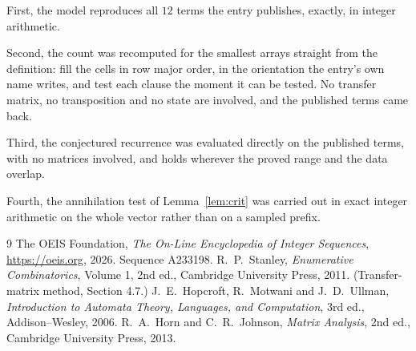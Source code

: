\documentclass[11pt,a4paper]{article}
\theoremstyle{plain}
\theoremstyle{definition}
\begin{document}
First, the model reproduces all $12$ terms the entry publishes, exactly, in integer
arithmetic.

Second, the count was recomputed for the smallest arrays straight from the definition: fill the
cells in row major order, in the orientation the entry's own name writes, and test each clause
the moment it can be tested. No transfer matrix, no transposition and no state are involved,
and the published terms came back.

Third, the conjectured recurrence was evaluated directly on the published terms, with no
matrices involved, and holds wherever the proved range and the data overlap.

Fourth, the annihilation test of Lemma~\ref{lem:crit} was carried out in exact integer
arithmetic on the whole vector rather than on a sampled prefix.

\begin{thebibliography}{9}
 The OEIS Foundation, \emph{The On-Line Encyclopedia of Integer
Sequences}, \url{https://oeis.org}, 2026. Sequence A233198.
 R.~P.~Stanley, \emph{Enumerative Combinatorics}, Volume 1, 2nd ed.,
Cambridge University Press, 2011. (Transfer-matrix method, Section 4.7.)
 J.~E.~Hopcroft, R.~Motwani and J.~D.~Ullman, \emph{Introduction to Automata
Theory, Languages, and Computation}, 3rd ed., Addison--Wesley, 2006.
 R.~A.~Horn and C.~R.~Johnson, \emph{Matrix Analysis}, 2nd ed., Cambridge
University Press, 2013.
\end{thebibliography}
\end{document}
